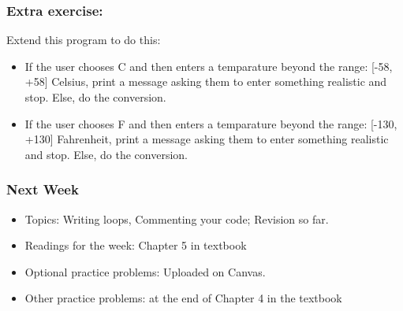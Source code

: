 \documentclass{beamer}
\begin{document}
\begin{frame}
\frametitle{Extra exercise: }
Extend this program to do this:
\begin{itemize}
\item If the user chooses C and then enters a temparature beyond the range: [-58, +58] Celsius, print a message asking them to enter something realistic and stop. Else, do the conversion.
\item If the user chooses F and then enters a temparature beyond the range: [-130, +130] Fahrenheit, print a message asking them to enter something realistic and stop. Else, do the conversion.
\end{itemize}
\end{frame}

\begin{frame}
\frametitle{Next Week}
\begin{itemize}
\item Topics: Writing loops, Commenting your code; Revision so far.
\item Readings for the week: Chapter 5 in textbook
\item Optional practice problems: Uploaded on Canvas.
\item Other practice problems: at the end of Chapter 4 in the textbook
\end{itemize}
\end{frame}
\end{document}
